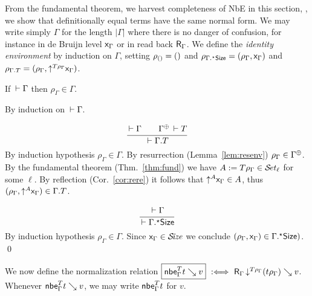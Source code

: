 \documentclass[acmlarge,review,anonymous]{acmart}\settopmatter{printfolios=true}
\makeatletter
\newenvironment{proof*}[1][\proofname]{\par
  \normalfont \topsep6\p@\@plus6\p@\relax
  \trivlist
  \item[\@proofindent\hskip\labelsep
        {\@proofnamefont #1\@addpunct{.}}]\ignorespaces
}{%
  \endtrivlist\@endpefalse
}
\makeatother
\begin{document}
From the fundamental theorem, we harvest completeness of NbE in this
section, \ie, we show that definitionally equal terms have the same
normal form.
We may write simply $\Gamma$ for the length $|\Gamma|$ where there is no
danger of confusion, for instance in de Bruijn level $\var\Gamma$ or
in read back $\tR_{\Gamma}$.
We define the \emph{identity environment} \fbox{$\rho_\Gamma$} by induction on $\Gamma$,
setting $\rho_{\cempty} = \sempty$ and
$\rho_{\eext \Gamma \Size} = (\rho_\Gamma, \var\Gamma)$ and
$\rho_{\cext \Gamma T} = (\rho_\Gamma, \up{T\rho_\Gamma} \var\Gamma)$.
\begin{lemma}
  If\/ $\der \Gamma$ then
  $\rho_\Gamma \in \Gamma$.
\end{lemma}
\begin{proof*}
By induction on $\der \Gamma$.
\begin{caselist}

\nextcase
\vspace{-3ex}
\[
  \ru{\der \Gamma \qquad \resurrect\Gamma \der T
    }{\der \cext\Gamma T}
\]
By induction hypothesis $\rho_\Gamma \in \Gamma$.
By resurrection (Lemma~\ref{lem:resenv}) $\rho_\Gamma \in \resurrect\Gamma$.
By the fundamental theorem (Thm.~\ref{thm:fund}) we have $A := T\rho_\Gamma \in \SET[\ell]$ for some $\ell$.
By reflection (Cor.~\ref{cor:rere}) it follows that $\up A \var\Gamma \in A$, thus
$(\rho_\Gamma, \up A \var\Gamma) \in \cext \Gamma T$.

\nextcase
\vspace{-3ex}
\[
  \ru{\der \Gamma
    }{\der \eext\Gamma \Size}
\]
By induction hypothesis $\rho_\Gamma \in \Gamma$.  Since $\var\Gamma \in \SIZE$ we conclude
$(\rho_\Gamma, \var\Gamma) \in \eext\Gamma \Size)$.
\qed
\end{caselist}
\end{proof*}

We now define the normalization relation
$\fbox{$\nbe \Gamma T t \evalsto v$} \defas \R {\Gamma} {\down{T \rho_\Gamma} (t \rho_\Gamma)} v$.
Whenever $\nbe \Gamma T t \evalsto v$, we may write $\nbe \Gamma T t$ for $v$.
\end{document}
